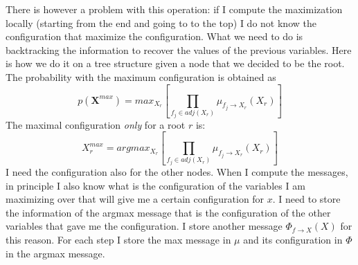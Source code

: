 There is however a problem with this operation: if I compute the maximization locally
(starting from the end and going to to the top) I do not know the configuration that
maximize the configuration. What we need to do is backtracking the information
to recover the values of the previous variables. Here is how we do it on a tree structure
given a node that we decided to be the root.\\ The probability with the maximum configuration
is obtained as
\[
	p(\textbf{X}^{max}) = max_{X_r}\left[ \prod_{f_j \in adj(X_r)}\mu_{f_j
	\rightarrow X_r}(X_{r}) \right]
\]
The maximal configuration \textit{only} for a root $r$ is:
\[
	X_{r}^{max}= argmax_{X_r}\left[ \prod_{f_j \in adj(X_r)}\mu_{f_j \rightarrow
	X_r}(X_{r}) \right]
\]
I need the configuration also for the other nodes. When I compute the messages, in
principle I also know what is the configuration of the variables I am maximizing
over that will give me a certain configuration for $x$. I need to store the
information of the argmax message that is the configuration of the other
variables that gave me the configuration. I store another message $\Phi_{f\rightarrow
X}(X)$ for this reason. For each step I store the max message in $\mu$ and its
configuration in $\Phi$ in the argmax message.
